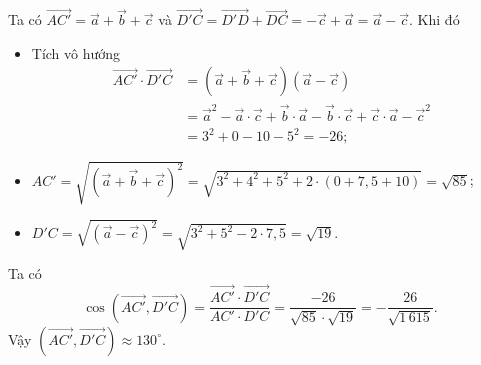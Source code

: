 \begin{ex}
{\begin{itemize}
		\end{itemize}
		Ta có $\overrightarrow{AC'}=\overrightarrow{a}+\overrightarrow{b}+\overrightarrow{c}$ và $\overrightarrow{D'C}=\overrightarrow{D'D}+\overrightarrow{DC}=-\overrightarrow{c}+\overrightarrow{a}=\overrightarrow{a}-\overrightarrow{c}$.  Khi đó 
		\begin{itemize}
			\item Tích vô hướng \allowdisplaybreaks\begin{align*}
				\overrightarrow{AC'} \cdot \overrightarrow{D'C} &= \left(\overrightarrow{a}+\overrightarrow{b}+\overrightarrow{c}\right)\left(\overrightarrow{a}-\overrightarrow{c}\right) \\
				&= \overrightarrow{a}^2-\overrightarrow{a}\cdot\overrightarrow{c}+\overrightarrow{b}\cdot\overrightarrow{a}-\overrightarrow{b}\cdot\overrightarrow{c}+\overrightarrow{c}\cdot\overrightarrow{a}-\overrightarrow{c}^2 \\
				&= 3^2+0-10-5^2=-26;
			\end{align*}
			\item $AC'=\sqrt{\left(\overrightarrow{a}+\overrightarrow{b}+\overrightarrow{c}\right)^2}=\sqrt{3^2+4^2+5^2+2\cdot (0+7{,}5+10)}=\sqrt{85}$;
			\item $D'C=\sqrt{\left(\overrightarrow{a}-\overrightarrow{c}\right)^2}=\sqrt{3^2+5^2-2\cdot 7{,}5}=\sqrt{19}$.
		\end{itemize}
		Ta có
		\[\cos\left(\overrightarrow{AC'}, \overrightarrow{D'C}\right)=\dfrac{\overrightarrow{AC'} \cdot \overrightarrow{D'C}}{AC'\cdot D'C}=\dfrac{-26}{\sqrt{85} \cdot \sqrt{19}}=-\dfrac{26}{\sqrt{1\,615}}.\]
		Vậy $\left(\overrightarrow{AC'}, \overrightarrow{D'C}\right) \approx 130^\circ$.
	}
\end{ex}

